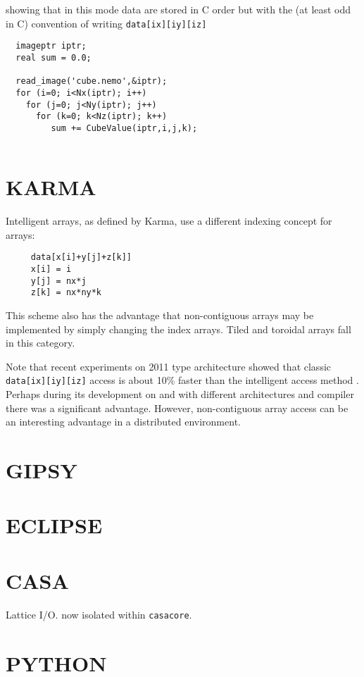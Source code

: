 \documentclass[preprint]{aastex} %
\begin{document}
showing that in this mode data are stored in C order but with the
(at least odd in C) convention of writing {\tt data[ix][iy][iz]}

\footnotesize
\begin{verbatim}
  imageptr iptr;
  real sum = 0.0;

  read_image('cube.nemo',&iptr);
  for (i=0; i<Nx(iptr); i++)
    for (j=0; j<Ny(iptr); j++)
      for (k=0; k<Nz(iptr); k++)
         sum += CubeValue(iptr,i,j,k);
       
\end{verbatim}
\normalsize

\section{KARMA}

Intelligent arrays, as defined by Karma, use a different 
indexing concept for arrays:
\footnotesize
\begin{verbatim}
     data[x[i]+y[j]+z[k]]
     x[i] = i
     y[j] = nx*j
     z[k] = nx*ny*k
\end{verbatim}
\normalsize

This scheme also has the advantage that 
non-contiguous arrays may be implemented
by simply changing the index arrays.
Tiled and toroidal arrays fall in this
category.

Note that recent experiments on 2011 type architecture showed that
classic {\tt data[ix][iy][iz]} access is about 10\% faster than
the intelligent access method . Perhaps during its development
on and with different architectures and compiler there was a 
significant advantage. However, non-contiguous array access can
be an interesting advantage in a distributed environment.


\section{GIPSY}

\section{ECLIPSE}

\section{CASA}

Lattice I/O. now isolated within {\tt casacore}. 

\section{PYTHON}
\end{document}
